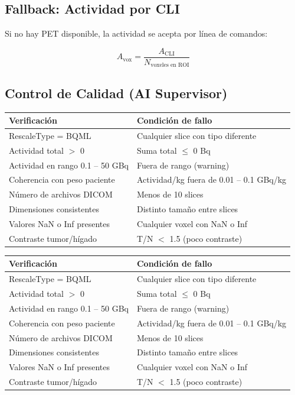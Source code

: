 \documentclass[12pt,a4paper]{article}
\begin{document}
\subsection{Fallback: Actividad por CLI}

Si no hay PET disponible, la actividad se acepta por línea de comandos:

$$A_{\text{vox}} = \frac{A_{\text{CLI}}}{N_{\text{voxeles en ROI}}}$$


\begin{tcolorbox}[aiSupervisor]
\subsection*{Control de Calidad (AI Supervisor)}

\begin{tabular}{p{5cm} p{10cm}}
\toprule
\textbf{Verificación} & \textbf{Condición de fallo} \\
\midrule
RescaleType = BQML & Cualquier slice con tipo diferente \\
Actividad total $>$ 0 & Suma total $\leq$ 0 Bq \\
Actividad en rango 0.1 -- 50 GBq & Fuera de rango (warning) \\
Coherencia con peso paciente & Actividad/kg fuera de 0.01 -- 0.1 GBq/kg \\
Número de archivos DICOM & Menos de 10 slices \\
Dimensiones consistentes & Distinto tamaño entre slices \\
Valores NaN o Inf presentes & Cualquier voxel con NaN o Inf \\
Contraste tumor/hígado & T/N $<$ 1.5 (poco contraste) \\
\bottomrule
\end{tabular}

\newpage




\begin{tabular}{p{5cm} p{10cm}}
\toprule
\textbf{Verificación} & \textbf{Condición de fallo} \\
\midrule
RescaleType = BQML & Cualquier slice con tipo diferente \\
Actividad total $>$ 0 & Suma total $\leq$ 0 Bq \\
Actividad en rango 0.1 -- 50 GBq & Fuera de rango (warning) \\
Coherencia con peso paciente & Actividad/kg fuera de 0.01 -- 0.1 GBq/kg \\
Número de archivos DICOM & Menos de 10 slices \\
Dimensiones consistentes & Distinto tamaño entre slices \\
Valores NaN o Inf presentes & Cualquier voxel con NaN o Inf \\
Contraste tumor/hígado & T/N $<$ 1.5 (poco contraste) \\
\bottomrule
\end{tabular}


\end{tcolorbox}
\end{document}
